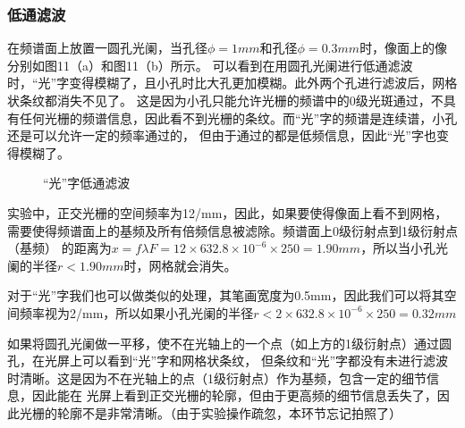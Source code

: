 \documentclass{article}
\begin{document}
    \subsubsection{低通滤波}
    在频谱面上放置一圆孔光阑，当孔径$\phi = 1mm$和孔径$\phi = 0.3mm$时，像面上的像分别如图11（a）和图11（b）所示。
    可以看到在用圆孔光阑进行低通滤波时，“光”字变得模糊了，且小孔时比大孔更加模糊。此外两个孔进行滤波后，网格状条纹都消失不见了。
    这是因为小孔只能允许光栅的频谱中的0级光斑通过，不具有任何光栅的频谱信息，因此看不到光栅的条纹。而“光”字的频谱是连续谱，小孔还是可以允许一定的频率通过的，
    但由于通过的都是低频信息，因此“光”字也变得模糊了。
    \begin{figure}[h]
        \centering
        \caption{“光”字低通滤波}
    \end{figure}

    实验中，正交光栅的空间频率为12/mm，因此，如果要使得像面上看不到网格，需要使得频谱面上的基频及所有倍频信息被滤除。频谱面上0级衍射点到1级衍射点（基频）
    的距离为$x=f\lambda F=12\times 632.8\times 10^{-6} \times 250=1.90mm$，所以当小孔光阑的半径$r < 1.90mm$时，网格就会消失。

    对于“光”字我们也可以做类似的处理，其笔画宽度为0.5mm，因此我们可以将其空间频率视为2/mm，所以如果小孔光阑的半径$r<2\times 632.8\times 10^{-6} \times 250 =0.32mm$

    如果将圆孔光阑做一平移，使不在光轴上的一个点（如上方的1级衍射点）通过圆孔，在光屏上可以看到“光”字和网格状条纹，
    但条纹和“光”字都没有未进行滤波时清晰。这是因为不在光轴上的点（1级衍射点）作为基频，包含一定的细节信息，因此能在
    光屏上看到正交光栅的轮廓，但由于更高频的细节信息丢失了，因此光栅的轮廓不是非常清晰。（由于实验操作疏忽，本环节忘记拍照了）
\end{document}
